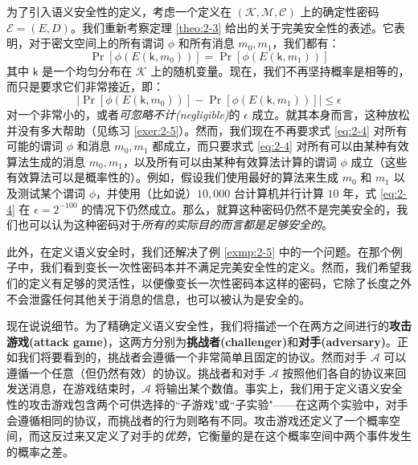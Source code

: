 为了引入语义安全性的定义，考虑一个定义在 $(\mathcal{K},\mathcal{M},\mathcal{C})$ 上的确定性密码 $\mathcal{E}=(E,D)$。我们重新考察定理 \ref{theo:2-3} 给出的关于完美安全性的表述。它表明，对于密文空间上的所有谓词 $\phi$ 和所有消息 $m_0,m_1$，我们都有：
\begin{equation}\label{eq:2-3}
\Pr[\phi(E(\mathsf{k},m_0))]=\Pr[\phi(E(\mathsf{k}, m_1))]
\end{equation}
其中 $\mathsf{k}$ 是一个均匀分布在 $\mathcal{K}$ 上的随机变量。现在，我们不再坚持概率是相等的，而只是要求它们非常接近，即：
\begin{equation}\label{eq:2-4}
\Big\lvert
\Pr[\phi(E(\mathsf{k},m_0))]-\Pr[\phi(E(\mathsf{k}, m_1))]
\Big\rvert
\leq\epsilon
\end{equation}
对一个非常小的，或者\emph{可忽略不计(negligible)}的 $\epsilon$ 成立。就其本身而言，这种放松并没有多大帮助（见练习 \ref{exer:2-5}）。然而，我们现在不再要求式 \ref{eq:2-4} 对所有可能的谓词 $\phi$ 和消息 $m_0,m_1$ 都成立，而只要求式 \ref{eq:2-4} 对所有可以由某种有效算法生成的消息 $m_0,m_1$，以及所有可以由某种有效算法计算的谓词 $\phi$ 成立（这些有效算法可以是概率性的）。例如，假设我们使用最好的算法来生成 $m_0$ 和 $m_1$ 以及测试某个谓词 $\phi$，并使用（比如说）$10,000$ 台计算机并行计算 $10$ 年，式 \ref{eq:2-4} 在 $\epsilon = 2^{-100}$ 的情况下仍然成立。那么，就算这种密码仍然不是完美安全的，我们也可以认为这种密码对于\emph{所有的实际目的而言都是足够安全的}。

此外，在定义语义安全时，我们还解决了例 \ref{exmp:2-5} 中的一个问题。在那个例子中，我们看到变长一次性密码本并不满足完美安全性的定义。然而，我们希望我们的定义有足够的灵活性，以便像变长一次性密码本这样的密码，它除了长度之外不会泄露任何其他关于消息的信息，也可以被认为是安全的。

现在说说细节。为了精确定义语义安全性，我们将描述一个在两方之间进行的\textbf{攻击游戏(attack game)}，这两方分别为\textbf{挑战者(challenger)}和\textbf{对手(adversary)}。正如我们将要看到的，挑战者会遵循一个非常简单且固定的协议。然而对手 $\mathcal{A}$ 可以遵循一个任意（但仍然有效）的协议。挑战者和对手 $\mathcal{A}$ 按照他们各自的协议来回发送消息，在游戏结束时，$\mathcal{A}$ 将输出某个数值。事实上，我们用于定义语义安全性的攻击游戏包含两个可供选择的``子游戏"或``子实验"——在这两个实验中，对手会遵循相同的协议，而挑战者的行为则略有不同。攻击游戏还定义了一个概率空间，而这反过来又定义了对手的\emph{优势}，它衡量的是在这个概率空间中两个事件发生的概率之差。

